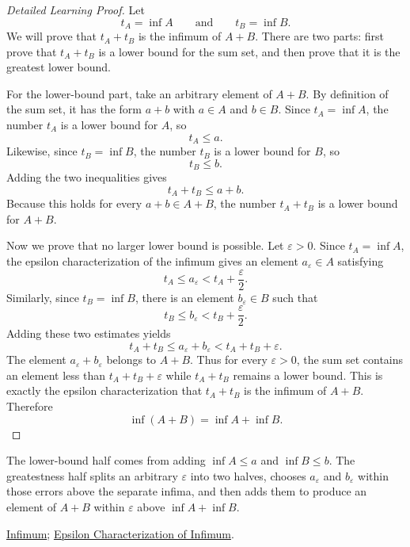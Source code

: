\begin{proof}[Detailed Learning Proof]
\LRAProofBodyStart
Let
\[
t_A=\inf A
\qquad\text{and}\qquad
t_B=\inf B.
\]
We will prove that $t_A+t_B$ is the infimum of $A+B$. There are two parts:
first prove that $t_A+t_B$ is a lower bound for the sum set, and then prove
that it is the greatest lower bound.

For the lower-bound part, take an arbitrary element of $A+B$. By definition
of the sum set, it has the form $a+b$ with $a\in A$ and $b\in B$. Since
$t_A=\inf A$, the number $t_A$ is a lower bound for $A$, so
\[
t_A\le a.
\]
Likewise, since $t_B=\inf B$, the number $t_B$ is a lower bound for $B$, so
\[
t_B\le b.
\]
Adding the two inequalities gives
\[
t_A+t_B\le a+b.
\]
Because this holds for every $a+b\in A+B$, the number $t_A+t_B$ is a lower
bound for $A+B$.

Now we prove that no larger lower bound is possible. Let $\varepsilon>0$.
Since $t_A=\inf A$, the epsilon characterization of the infimum gives an
element $a_\varepsilon\in A$ satisfying
\[
t_A\le a_\varepsilon<t_A+\frac{\varepsilon}{2}.
\]
Similarly, since $t_B=\inf B$, there is an element
$b_\varepsilon\in B$ such that
\[
t_B\le b_\varepsilon<t_B+\frac{\varepsilon}{2}.
\]
Adding these two estimates yields
\[
t_A+t_B
\le
a_\varepsilon+b_\varepsilon
<
t_A+t_B+\varepsilon.
\]
The element $a_\varepsilon+b_\varepsilon$ belongs to $A+B$. Thus for every
$\varepsilon>0$, the sum set contains an element less than
$t_A+t_B+\varepsilon$ while $t_A+t_B$ remains a lower bound. This is exactly
the epsilon characterization that $t_A+t_B$ is the infimum of $A+B$.
Therefore
\[
\inf(A+B)=\inf A+\inf B.
\]
\end{proof}

\begin{remark*}
The lower-bound half comes from adding $\inf A\le a$ and $\inf B\le b$. The
greatestness half splits an arbitrary $\varepsilon$ into two halves, chooses
$a_\varepsilon$ and $b_\varepsilon$ within those errors above the separate
infima, and then adds them to produce an element of $A+B$ within
$\varepsilon$ above $\inf A+\inf B$.
\end{remark*}

\begin{dependencies}
\hyperref[def:infimum]{Infimum};
\hyperref[def:epsilon-characterization-of-infimum]{Epsilon Characterization of Infimum}.
\end{dependencies}

\clearpage
